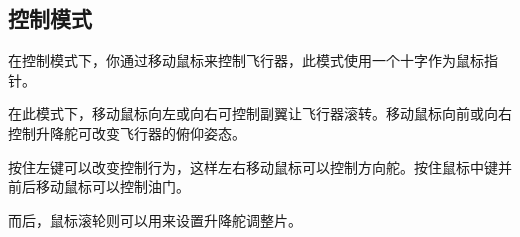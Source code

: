 \ifchinese
\subsection{控制模式}
\fi

{}

\ifchinese
在控制模式下，你通过移动鼠标来控制飞行器，此模式使用一个十字作为鼠标指针。

在此模式下，移动鼠标向左或向右可控制副翼让飞行器滚转。移动鼠标向前或向右控制升降舵可改变飞行器的俯仰姿态。

按住左键可以改变控制行为，这样左右移动鼠标可以控制方向舵。按住鼠标中键并前后移动鼠标可以控制油门。

而后，鼠标滚轮则可以用来设置升降舵调整片。

